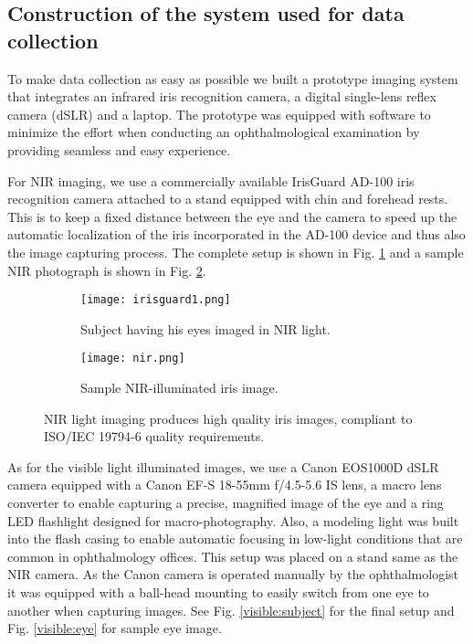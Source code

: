 \documentclass[a4paper]{spie}
\begin{document}
\subsection{Construction of the system used for data collection}
To make data collection as easy as possible we built a prototype imaging system that integrates an infrared iris recognition camera, a digital single-lens reflex camera (dSLR) and a laptop. The prototype was equipped with software to minimize the effort when conducting an ophthalmological examination by providing seamless and easy experience. 

For NIR imaging, we use a commercially available IrisGuard AD-100 iris recognition camera attached to a stand equipped with chin and forehead rests. This is to keep a fixed distance between the eye and the camera to speed up the automatic localization of the iris incorporated in the AD-100 device and thus also the image capturing process. The complete setup is shown in Fig. \ref{nir:subject} and a sample NIR photograph is shown in Fig. \ref{nir:eye}.

\begin{figure}
\centering
\begin{subfigure}{0.5\textwidth}
  \centering
  \texttt{[image: irisguard1.png]}
  \caption{Subject having his eyes imaged in NIR light.}
  \label{nir:subject}
\end{subfigure}%
\begin{subfigure}{0.5\textwidth}
  \centering
  \texttt{[image: nir.png]}
  \caption{Sample NIR-illuminated iris image.}
  \label{nir:eye}
\end{subfigure}
\vskip0.2cm
\caption{NIR light imaging produces high quality iris images, compliant to ISO/IEC 19794-6 quality requirements.}
\label{nir}
\end{figure}

As for the visible light illuminated images, we use a Canon EOS1000D dSLR camera equipped with a Canon EF-S 18-55mm f/4.5-5.6 IS lens, a macro lens converter to enable capturing a precise, magnified image of the eye and a ring LED flashlight designed for macro-photography. Also, a modeling light was built into the flash casing to enable automatic focusing in low-light conditions that are common in ophthalmology offices. This setup was placed on a stand same as the NIR camera. As the Canon camera is operated manually by the ophthalmologist it was equipped with a ball-head mounting to easily switch from one eye to another when capturing images. See Fig. \ref{visible:subject} for the final setup and Fig. \ref{visible:eye} for sample eye image.
\end{document}
